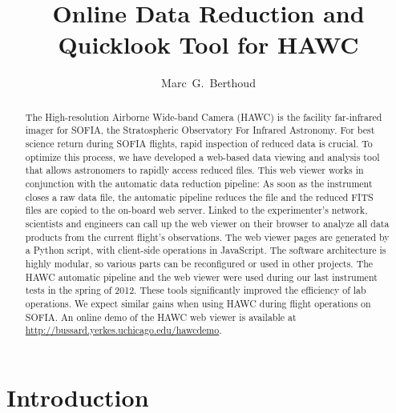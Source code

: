 
\resetcounters




\title{Online Data Reduction and Quicklook Tool for HAWC}
\author{Marc~G.~Berthoud
}


\begin{abstract}
The High-resolution Airborne Wide-band Camera (HAWC) is the facility far-infrared imager for SOFIA, the Stratospheric Observatory For Infrared Astronomy.  For best science return during SOFIA flights, rapid inspection of reduced data is crucial. To optimize this process, we have developed a web-based data viewing and analysis tool that allows astronomers to rapidly access reduced files.  This web viewer works in conjunction with the automatic data reduction pipeline: As soon as the instrument closes a raw data file, the automatic pipeline reduces the file and the reduced FITS files are copied to the on-board web server. Linked to the experimenter's network, scientists and engineers can call up the web viewer on their browser to analyze all data products from the current flight's observations.  The web viewer pages are generated by a Python script, with client-side operations in JavaScript. The software architecture is highly modular, so various parts can be reconfigured or used in other projects.  The HAWC automatic pipeline and the web viewer were used during our last instrument tests in the spring of 2012. These tools significantly improved the efficiency of lab operations. We expect similar gains when using HAWC during flight operations on SOFIA. An online demo of the HAWC web viewer is available at \url{http://bussard.yerkes.uchicago.edu/hawcdemo}.\end{abstract}

\section{Introduction}

